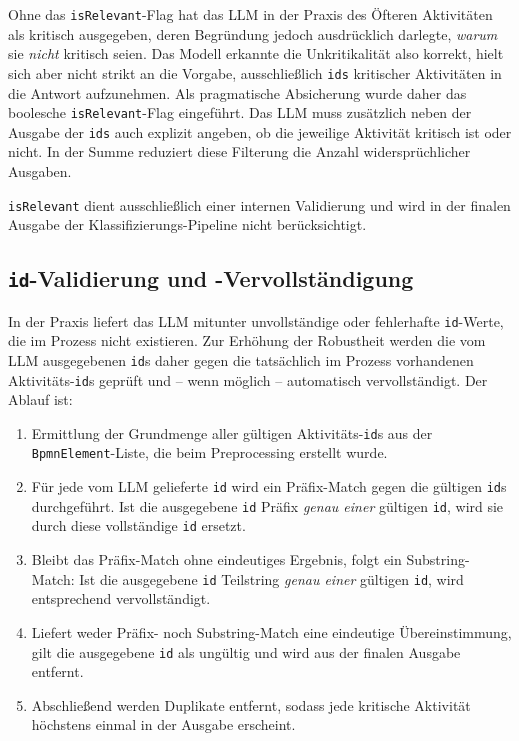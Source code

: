 Ohne das \texttt{isRelevant}-Flag hat das \ac{LLM} in der Praxis des Öfteren Aktivitäten als kritisch ausgegeben, deren Begründung jedoch ausdrücklich darlegte, \emph{warum} sie \emph{nicht} kritisch seien. Das Modell erkannte die Unkritikalität also korrekt, hielt sich aber nicht strikt an die Vorgabe, ausschließlich \texttt{ids} kritischer Aktivitäten in die Antwort aufzunehmen. Als pragmatische Absicherung wurde daher das boolesche \texttt{isRelevant}-Flag eingeführt. Das \ac{LLM} muss zusätzlich neben der Ausgabe der \texttt{ids} auch explizit angeben, ob die jeweilige Aktivität kritisch ist oder nicht. In der Summe reduziert diese Filterung die Anzahl widersprüchlicher Ausgaben.

\texttt{isRelevant} dient ausschließlich einer internen Validierung und wird in der finalen Ausgabe der Klassifizierungs-Pipeline nicht berücksichtigt.

\subsection*{\texttt{id}-Validierung und -Vervollständigung}

In der Praxis liefert das \ac{LLM} mitunter unvollständige oder fehlerhafte \texttt{id}-Werte, die im Prozess nicht existieren. Zur Erhöhung der Robustheit werden die vom \ac{LLM} ausgegebenen \texttt{id}s daher gegen die tatsächlich im Prozess vorhandenen Aktivitäts-\texttt{id}s geprüft und – wenn möglich – automatisch vervollständigt. Der Ablauf ist:

\begin{enumerate}
    \item Ermittlung der Grundmenge aller gültigen Aktivitäts-\texttt{id}s aus der \texttt{BpmnElement}-Liste, die beim Preprocessing erstellt wurde.
    \item Für jede vom \ac{LLM} gelieferte \texttt{id} wird ein Präfix-Match gegen die gültigen \texttt{id}s durchgeführt. Ist die ausgegebene \texttt{id} Präfix \emph{genau einer} gültigen \texttt{id}, wird sie durch diese vollständige \texttt{id} ersetzt.
    \item Bleibt das Präfix-Match ohne eindeutiges Ergebnis, folgt ein Substring-Match: Ist die ausgegebene \texttt{id} Teilstring \emph{genau einer} gültigen \texttt{id}, wird entsprechend vervollständigt.
    \item Liefert weder Präfix- noch Substring-Match eine eindeutige Übereinstimmung, gilt die ausgegebene \texttt{id} als ungültig und wird aus der finalen Ausgabe entfernt.
    \item Abschließend werden Duplikate entfernt, sodass jede kritische Aktivität höchstens einmal in der Ausgabe erscheint.
\end{enumerate}

